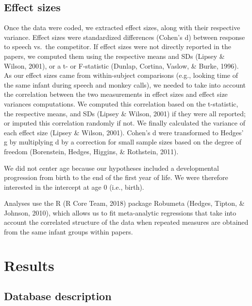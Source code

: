 \documentclass[
  english,
  man]{apa6}
\begin{document}
\hypertarget{effect-sizes}{%
\subsection{Effect sizes}\label{effect-sizes}}

Once the data were coded, we extracted effect sizes, along with their respective variance. Effect sizes were standardized differences (Cohen's d) between response to speech vs.~the competitor.
If effect sizes were not directly reported in the papers, we computed them using the respective means and SDs (Lipsey \& Wilson, 2001), or a t- or F-statistic (Dunlap, Cortina, Vaslow, \& Burke, 1996). As our effect sizes came from within-subject comparisons (e.g., looking time of the same infant during speech and monkey calls), we needed to take into account the correlation between the two measurements in effect sizes and effect size variances computations. We computed this correlation based on the t-statistic, the respective means, and SDs (Lipsey \& Wilson, 2001) if they were all reported; or imputed this correlation randomly if not. We finally calculated the variance of each effect size (Lipsey \& Wilson, 2001). Cohen's d were transformed to Hedges' g by multiplying d by a correction for small sample sizes based on the degree of freedom (Borenstein, Hedges, Higgins, \& Rothstein, 2011).

We did not center age because our hypotheses included a developmental progression from birth to the end of the first year of life. We were therefore interested in the intercept at age 0 (i.e., birth).

Analyses use the R (R Core Team, 2018) package Robumeta (Hedges, Tipton, \& Johnson, 2010), which allows us to fit meta-analytic regressions that take into account the correlated structure of the data when repeated measures are obtained from the same infant groups within papers.

\hypertarget{results}{%
\section{Results}\label{results}}

\hypertarget{database-description}{%
\subsection{Database description}\label{database-description}}
\end{document}
